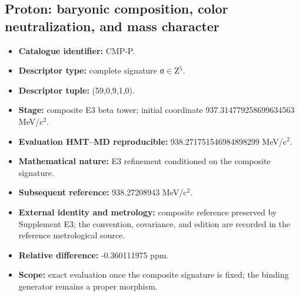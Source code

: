 \subsection{Proton: baryonic composition, color neutralization, and mass character}
\begin{itemize}
\item \textbf{Catalogue identifier:} CMP-P.
\item \textbf{Descriptor type:} complete signature σ\(\in\)Z\({}^{5}\).
\item \textbf{Descriptor tuple:} (59,0,9,1,0).
\item \textbf{Stage:} composite E3 beta tower; initial coordinate 937.314779\allowbreak{}258699\allowbreak{}634563 MeV/c\({}^{2}\).
\item \textbf{Evaluation HMT--MD reproducible:} 938.271751\allowbreak{}546984\allowbreak{}898299 MeV/c\({}^{2}\).
\item \textbf{Mathematical nature:} E3 refinement conditioned on the composite signature.
\item \textbf{Subsequent reference:} 938.272089\allowbreak{}43 MeV/c\({}^{2}\).
\item \textbf{External identity and metrology:} composite reference preserved by Supplement E3; the convention, covariance, and edition are recorded in the reference metrological source.
\item \textbf{Relative difference:} -0.360111\allowbreak{}975 ppm.
\item \textbf{Scope:} exact evaluation once the composite signature is fixed; the binding generator remains a proper morphism.
\end{itemize}
